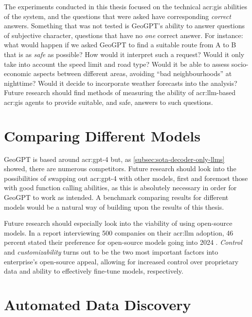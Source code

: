 The experiments conducted in this thesis focused on the technical \acrshort{acr:gis} abilities of the system, and the questions that were asked have corresponding \textit{correct} answers. Something that was not tested is GeoGPT's ability to answer questions of subjective character, questions that have no \textit{one} correct answer. For instance: what would happen if we asked GeoGPT to find a suitable route from A to B that is as \textit{safe} as possible? How would it interpret such a request? Would it only take into account the speed limit and road type? Would it be able to assess socio-economic aspects between different areas, avoiding \enquote{bad neighbourhoods} at nighttime? Would it decide to incorporate weather forecasts into the analysis? Future research should find methods of measuring the ability of \acrshort{acr:llm}-based \acrshort{acr:gis} agents to provide suitable, and safe, answers to such questions.

\section{Comparing Different Models}
\label{sec:comparing-different-models}

GeoGPT is based around \acrshort{acr:gpt}-4 but, as \autoref{subsec:sota-decoder-only-llms} showed, there are numerous competitors. Future research should look into the possibilities of swapping out \acrshort{acr:gpt}-4 with other models, first and foremost those with good function calling abilities, as this is absolutely necessary in order for GeoGPT to work as intended. A benchmark comparing results for different models would be a natural way of building upon the results of this thesis.

Future research should especially look into the viability of using open-source models. In a report interviewing 500 companies on their \acrshort{acr:llm} adoption, 46 percent stated their preference for open-source models going into 2024 \citep{wangsarah16ChangesWay2024}. \textit{Control} and \textit{customizability} turns out to be the two most important factors into enterprise's open-source appeal, allowing for increased control over proprietary data and ability to effectively fine-tune models, respectively.

\section{Automated Data Discovery}
\label{sec:automated-data-discovery}

